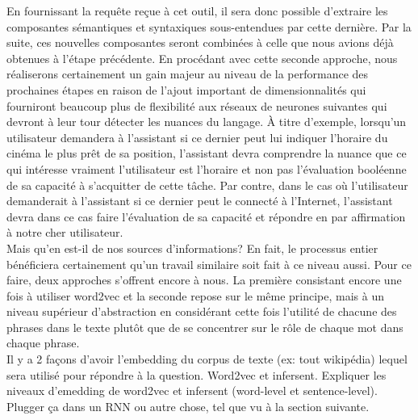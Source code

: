 En fournissant la requête reçue à cet outil, il sera donc possible d'extraire les composantes sémantiques et syntaxiques sous-entendues par cette dernière. Par la suite, ces nouvelles composantes seront combinées à celle que nous avions déjà obtenues à l'étape précédente. En procédant avec cette seconde approche, nous réaliserons certainement un gain majeur au niveau de la performance des prochaines étapes en raison de l'ajout important de dimensionnalités qui fourniront beaucoup plus de flexibilité aux réseaux de neurones suivantes qui devront à leur tour détecter les nuances du langage. À titre d'exemple, lorsqu'un utilisateur demandera à l'assistant si ce dernier peut lui indiquer l'horaire du cinéma le plus prêt de sa position, l'assistant devra comprendre la nuance que ce qui intéresse vraiment l'utilisateur est l'horaire et non pas l'évaluation booléenne de sa capacité à s'acquitter de cette tâche. Par contre, dans le cas où l'utilisateur demanderait à l'assistant si ce dernier peut le connecté à l'Internet, l'assistant devra dans ce cas faire l'évaluation de sa capacité et répondre en par affirmation à notre cher utilisateur. \\

Mais qu'en est-il de nos sources d'informations? En fait, le processus entier bénéficiera certainement qu'un travail similaire soit fait à ce niveau aussi. Pour ce faire, deux approches s'offrent encore à nous. La première consistant encore une fois à utiliser word2vec et la seconde repose sur le même principe, mais à un niveau supérieur d'abstraction en considérant cette fois l'utilité de chacune des phrases dans le texte plutôt que de se concentrer sur le rôle de chaque mot dans chaque phrase.  \\

Il y a 2 façons d’avoir l’embedding du corpus de texte (ex: tout wikipédia) lequel sera utilisé pour répondre à la question. Word2vec et infersent. Expliquer les niveaux d’emedding de word2vec et infersent (word-level et sentence-level). Plugger ça dans un RNN ou autre chose, tel que vu à la section suivante.
